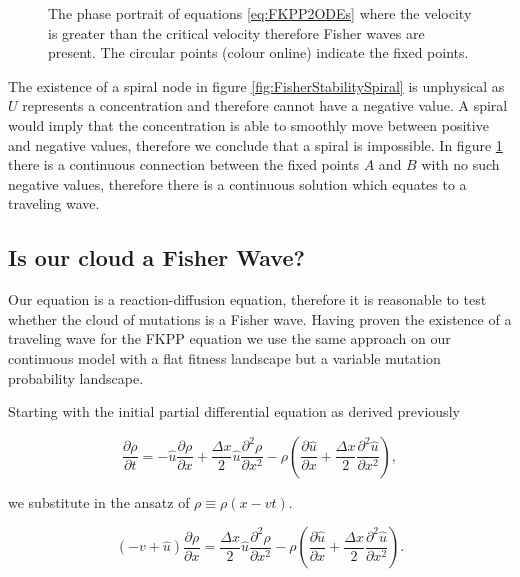 \documentclass[12pt, a4paper,]{article}
\begin{document}
\begin{figure}[H]
	\begin{subfigure}[h]{0.5\textwidth}
		
	\end{subfigure}%
	\begin{subfigure}[h]{0.5\textwidth}
		
	\end{subfigure}
	\caption{The phase portrait of equations \eqref{eq:FKPP2ODEs} where the velocity is greater than the critical velocity therefore Fisher waves are present. The circular points (colour online) indicate the fixed points.}
	\label{fig:FisherStabilityStable}
\end{figure}

The existence of a spiral node in figure \ref{fig:FisherStabilitySpiral} is unphysical as $U$ represents a concentration and therefore cannot have a negative value. A spiral would imply that the concentration is able to smoothly move between positive and negative values, therefore we conclude that a spiral is impossible.  In figure \ref{fig:FisherStabilityStable} there is a continuous connection between the fixed points $A$ and $B$ with no such negative values, therefore there is a continuous solution which equates to a traveling wave. 

\subsection{Is our cloud a Fisher Wave?}
Our equation is a reaction-diffusion equation, therefore it is reasonable to test whether the cloud of mutations is a Fisher wave. 
Having proven the existence of a traveling wave for the FKPP equation we use the same approach on our continuous model with a flat fitness landscape but a variable mutation probability landscape. 

Starting with the initial partial differential equation as derived previously 

\begin{equation}
\frac{\partial \rho}{\partial t} = - \hat{u} \frac{\partial \rho}{\partial x} + \frac{\Delta x}{2} \hat{u} \frac{\partial ^2 \rho}{\partial x ^2} - \rho\left( \frac{\partial \hat{u}}{\partial x} + \frac{\Delta x}{2} \frac{\partial ^2 \hat{u}}{\partial x^2} \right),
\end{equation}

we substitute in the ansatz of $\rho \equiv \rho (x - vt)$. 

\begin{equation}
(- v + \hat{u} ) \frac{\partial \rho}{\partial x}  = \frac{\Delta x }{2} \hat{u} \frac{\partial ^2 \rho}{\partial x ^2}  - \rho \left( \frac{\partial \hat{u}}{\partial x} + \frac{\Delta x}{2} \frac{\partial ^2 \hat{u}}{\partial x^2} \right).
\end{equation}
\end{document}
